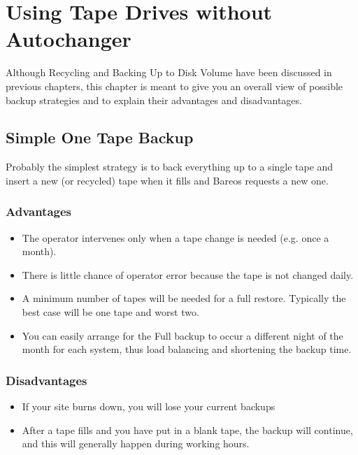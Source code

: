 
\chapter{Using Tape Drives without Autochanger}
\label{StrategiesChapter}

Although Recycling and Backing Up to Disk Volume have been discussed in
previous chapters, this chapter is meant to give you an overall view of
possible backup strategies and to explain their advantages and disadvantages.
\label{Simple}

\section{Simple One Tape Backup}

Probably the simplest strategy is to back everything up to a single tape and
insert a new (or recycled) tape when it fills and Bareos requests a new one.

\subsection{Advantages}

\begin{itemize}
\item The operator intervenes only when a tape change is needed  (e.g. once a
   month).
\item There is little chance of operator error because the tape  is not
   changed daily.
\item A minimum number of tapes will be needed for a full restore.  Typically
   the best case will be one tape and worst two.
\item You can easily arrange for the Full backup to occur a different  night
   of the month for each system, thus load balancing and  shortening the backup
   time.
\end{itemize}

\subsection{Disadvantages}

\begin{itemize}
\item If your site burns down, you will lose your current backups
\item After a tape fills and you have put in a blank tape, the  backup will
   continue, and this will generally happen during  working hours.
   \end{itemize}

